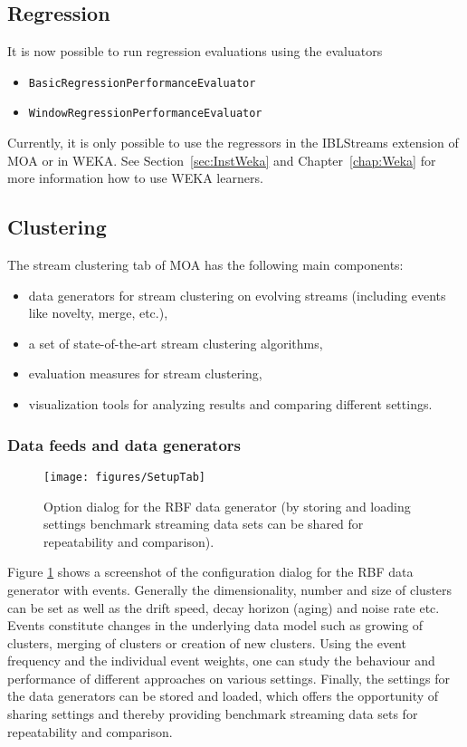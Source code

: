 \documentclass[a4paper,12pt,twoside]{book}
\begin{document}
\subsection{Regression}

It is now possible to run regression evaluations using the evaluators
\begin{itemize}
\item {\tt BasicRegressionPerformanceEvaluator}  
\item {\tt WindowRegressionPerformanceEvaluator}
\end{itemize}
Currently, it is only possible to use the regressors in the IBLStreams extension of MOA or in WEKA.
See Section~\ref{sec:InstWeka} and Chapter~\ref{chap:Weka} for more information how to use WEKA learners. 


\subsection{Clustering}

The stream clustering tab of MOA has the following main components:
\begin{itemize}
	\item data generators for stream clustering on evolving streams (including events like novelty, merge, etc.),
	\item a set of state-of-the-art stream clustering algorithms,
	\item evaluation measures for stream clustering,
	\item visualization tools for analyzing results and comparing different settings.
\end{itemize}

\subsubsection{Data feeds and data generators}
\label{sec:generators}

\begin{figure}[t]
	\centering
		\texttt{[image: figures/SetupTab]}
	\caption{Option dialog for the RBF data generator (by storing and loading settings benchmark streaming data sets can be shared for repeatability and comparison).}
	\label{fig:framework}
\end{figure}
Figure \ref{fig:framework} shows a screenshot of the configuration dialog for the RBF data generator with events. 
Generally the dimensionality, number and size of clusters can be set as well as the drift speed, decay horizon (aging) and noise rate etc.
 Events constitute changes in the underlying data model such as growing of clusters, merging of clusters or creation of new clusters. 
Using the event frequency and the individual event weights, one can study the behaviour and performance of different approaches on various settings. 
Finally, the settings for the data generators can be stored and loaded, which offers the opportunity of sharing settings and thereby providing benchmark streaming data 
sets for repeatability and comparison. 
\end{document}
